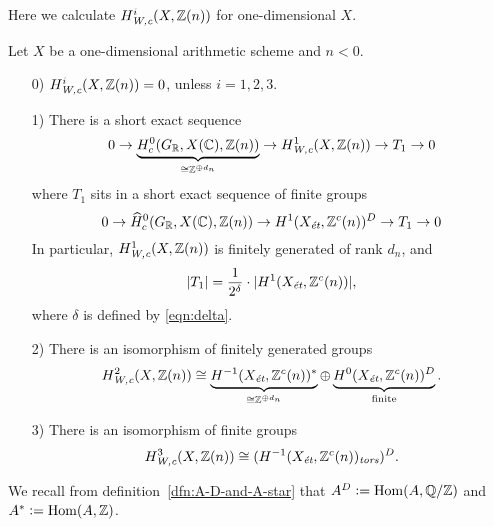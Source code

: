\documentclass[draft]{article}
\numberwithin{equation}{section}
\begin{document}
Here we calculate $H^i_\Wc (X, \ZZ(n))$ for one-dimensional $X$.

\begin{proposition}
  \label{prop:calculation-of-H-Wc}
  Let $X$ be a one-dimensional arithmetic scheme and $n < 0$.

  \begin{enumerate}
  \item[0)] $H^i_\Wc (X, \ZZ(n)) = 0$, unless $i = 1,2,3$.

  \item[1)] There is a short exact sequence
    \begin{equation}
      \label{eqn:H1Wc-ses}
      0 \to \underbrace{H^0_c (G_\RR, X(\CC), \ZZ(n))}_{\cong \ZZ^{\oplus d_n}} \to
      H^1_\Wc (X, \ZZ(n)) \to T_1 \to 0
    \end{equation}
    where $T_1$ sits in a short exact sequence of finite groups
    \[ 0 \to \widehat{H}^0_c (G_\RR, X(\CC), \ZZ(n)) \to
      H^1 (X_\et, \ZZ^c(n))^D \to
      T_1 \to 0 \]
    In particular, $H^1_\Wc (X, \ZZ(n))$ is finitely generated of rank $d_n$,
    and
    $$|T_1| = \frac{1}{2^\delta}\cdot |H^1 (X_\et, \ZZ^c (n))|,$$
    where $\delta$ is defined by \eqref{eqn:delta}.

  \item[2)] There is an isomorphism of finitely generated groups
    \[ H^2_\Wc (X, \ZZ(n)) \cong
      \underbrace{H^{-1} (X_\et, \ZZ^c(n))^*}_{\cong \ZZ^{\oplus d_n}}
      \oplus
      \underbrace{H^0 (X_\et, \ZZ^c(n))^D}_{\text{finite}}. \]

  \item[3)] There is an isomorphism of finite groups
    $$H^3_\Wc (X, \ZZ(n)) \cong (H^{-1} (X_\et, \ZZ^c(n))_\tors)^D.$$
  \end{enumerate}
\end{proposition}

We recall from definition~\ref{dfn:A-D-and-A-star} that
$A^D \dfn \Hom (A, \QQ/\ZZ)$ and $A^* \dfn \Hom (A, \ZZ)$.
\end{document}

